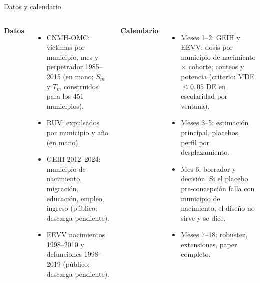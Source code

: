 \documentclass[aspectratio=169,10pt]{beamer}
\begin{document}
\begin{frame}{Datos y calendario}
\small
\begin{columns}[T]
\textbf{Datos}
\begin{itemize}
\item CNMH-OMC: víctimas por municipio, mes y perpetrador 1985--2015 (en mano; $S_m$ y $T_m$ construidos para los 451 municipios).
\item RUV: expulsados por municipio y año (en mano).
\item GEIH 2012--2024: municipio de nacimiento, migración, educación, empleo, ingreso (público; descarga pendiente).
\item EEVV nacimientos 1998--2010 y defunciones 1998--2019 (público; descarga pendiente).
\end{itemize}
\textbf{Calendario}
\begin{itemize}
\item Meses 1--2: GEIH y EEVV; dosis por municipio de nacimiento $\times$ cohorte; conteos y potencia (criterio: MDE $\le 0{,}05$ DE en escolaridad por ventana).
\item Meses 3--5: estimación principal, placebos, perfil por desplazamiento.
\item Mes 6: borrador y decisión. Si el placebo pre-concepción falla con municipio de nacimiento, el diseño no sirve y se dice.
\item Meses 7--18: robustez, extensiones, paper completo.
\end{itemize}
\end{columns}
\end{frame}
\end{document}

